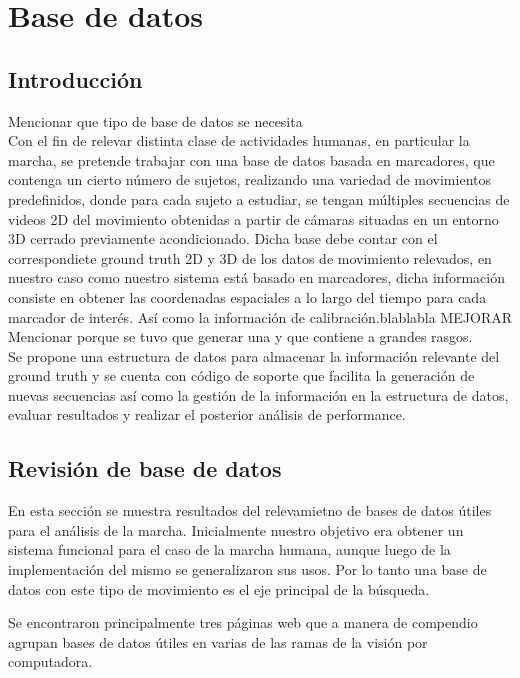 \section{Base de datos}


\subsection{Introducción}
\label{}
Mencionar que tipo de base de datos se necesita\\
Con el fin de relevar distinta clase de actividades humanas, en particular la marcha, se pretende trabajar con una base de datos basada en marcadores, que contenga un cierto número de sujetos, realizando una variedad de movimientos predefinidos, donde para cada sujeto a estudiar, se tengan múltiples secuencias de videos 2D del movimiento obtenidas a partir de cámaras situadas en un entorno 3D cerrado previamente acondicionado. Dicha base debe contar con el correspondiete ground truth 2D y 3D de los datos de movimiento relevados, en nuestro caso como nuestro sistema está basado en marcadores, dicha información consiste en obtener las coordenadas espaciales a lo largo del tiempo para cada marcador de interés. Así como la información de calibración.blablabla MEJORAR \\

Mencionar porque se tuvo que generar una y que contiene a grandes rasgos.\\
Se propone una estructura de datos para almacenar la información relevante del ground truth y  se cuenta con código de soporte que facilita la generación de nuevas secuencias así como la gestión de la información en la estructura de datos, evaluar resultados y realizar el  posterior análisis de performance.

\subsection{Revisión de base de datos}
\label{}
En esta sección se muestra  resultados del relevamietno de bases de datos útiles para el análisis de la marcha.
Inicialmente nuestro objetivo era obtener un sistema funcional para el caso de la marcha humana, aunque luego de la implementación del mismo se generalizaron sus usos. Por lo tanto una base de datos con este tipo de movimiento es el eje principal de la búsqueda.

Se encontraron principalmente tres páginas web que a manera de compendio agrupan  bases de datos útiles en varias de las ramas de la visión por computadora.

